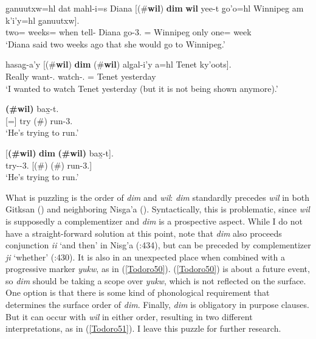 \documentclass[output=paper]{langscibook}
\begin{document}
\begin{exe}
\ex \label{Todoro49}
\begin{xlist}

\ex \label{Todoro49a}
 {g̱anuutxw=hl}  {dat} 	  { mahl-i=s}	{ Diana}  [(\#{\textbf{wil}}) {\textbf{dim}}   {\textbf{wil}}     {yee-t}   {g̱o’o=h}l { Winnipeg} {am} {k’i’y=hl}	{g̱anuutxw}]. \\
     two= weeks=    	when 	   tell- Diana	   go-3.{\seriesII}  =  Winnipeg  only one=    week\\
\glt `Diana said two weeks ago that she would go to Winnipeg.' 

\ex \label{Todoro49b}
 	   {hasag̱-a’y}     [(\#{\textbf{wil}}) \textbf{{dim}} (\#\textbf{{wil}})	{alg̱al-i’y} 		{a=hl}		{Tenet}		{ky’oots}]. \\
	Really want-{\sg}.{\seriesII}       	watch-{\sg}.{\seriesII} 	= 	Tenet 		yesterday\\
\glt `I wanted to watch Tenet yesterday (but it is not being shown anymore).' 

\ex \label{Todoro49c}
 	\textbf{(\#{wil})} 	{bax̱-t}.\\
		[=]	try	(\#)	run-3.{\seriesII} \\
\glt ‘He’s trying to run.' 

\ex \label{Todoro49d}
	 [\textbf{(\#{wil})}  \textbf{{dim}}		\textbf{(\#{wil})} {bax̱-t}]. \\
	try--3.{\seriesII}	 [(\#)    	(\#)	run-3.{\seriesII}]\\
\glt `He’s trying to run.' 

\end{xlist}
\end{exe}

What is puzzling is the order of \emph{dim} and \emph{wil}: \emph{dim} standardly precedes \emph{wil} in both Gitksan (\citealt{rigsby1986a}) and neighboring Nisga’a (\citealt{tarpent1987a}). Syntactically, this is problematic, since \emph{wil} is supposedly a complementizer and \emph{dim} is a prospective aspect. While I do not have a straight-forward solution at this point, note that \emph{dim} also proceeds conjunction \emph{ii} ‘and then’ in Nisg’a (\citealt{tarpent1987a}:434), but can be preceded by complementizer \emph{ji} ‘whether’ (\citealt{tarpent1987a}:430). It is also in an unexpected place when combined with a progressive marker \textit{yukw}, as in (\ref{Todoro50}). (\ref{Todoro50}) is about a future event, so \emph{dim} should be taking a scope over \emph{yukw}, which is not reflected on the surface. One option is that there is some kind of phonological requirement that determines the surface order of \emph{dim}. Finally, \emph{dim} is obligatory in purpose clauses. But it can occur with \emph{wil} in either order, resulting in two different interpretations, as in (\ref{Todoro51}). I leave this puzzle for further research. 
\end{document}
